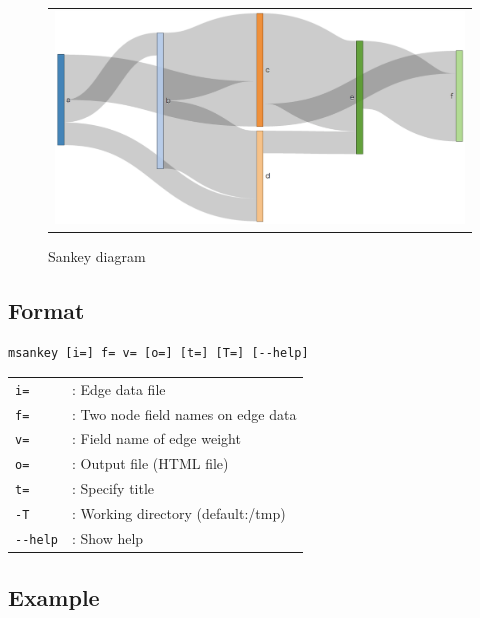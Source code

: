 \begin{figure}[htbp]
\begin{center}
\begin{tabular}{c}

\begin{minipage}{0.5\hsize}
\begin{center}
\includegraphics[scale=0.5]{figure/sankey1.eps}
\caption{Sankey diagram \label{fig:sankey1}}
\end{center}
\end{minipage}

\end{tabular}
\end{center}
\end{figure}



\subsection{Format}
\begin{verbatim}
msankey [i=] f= v= [o=] [t=] [T=] [--help]
\end{verbatim}

\begin{table}[htbp]
{\small
\begin{tabular}{ll}
\verb|i=| & : Edge data file   \\
\verb|f=| & : Two node field names on edge data \\
\verb|v=| & : Field name of edge weight  \\
\verb|o=| & : Output file (HTML file) \\
\verb|t=| & : Specify title  \\

\verb|-T| & : Working directory (default:/tmp) \\
\verb|--help| & : Show help \\
\end{tabular} 
}
\end{table} 

\subsection{Example}


%

